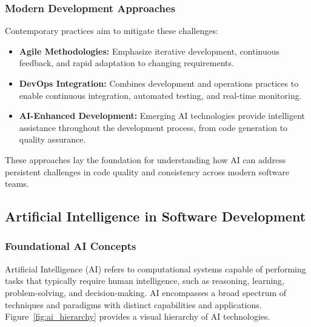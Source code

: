 \begin{spacing}{1.2}
\subsubsection*{Modern Development Approaches}
Contemporary practices aim to mitigate these challenges:

\begin{itemize}
    \item \textbf{Agile Methodologies:} Emphasize iterative development, continuous feedback, and rapid adaptation to changing requirements.
    
    \item \textbf{DevOps Integration:} Combines development and operations practices to enable continuous integration, automated testing, and real-time monitoring.
    
    \item \textbf{AI-Enhanced Development:} Emerging AI technologies provide intelligent assistance throughout the development process, from code generation to quality assurance.
\end{itemize}

These approaches lay the foundation for understanding how AI can address persistent challenges in code quality and consistency across modern software teams.

\subsection{Artificial Intelligence in Software Development}

\subsubsection*{Foundational AI Concepts}
Artificial Intelligence (AI) refers to computational systems capable of performing tasks that typically require human intelligence, such as reasoning, learning, problem-solving, and decision-making. AI encompasses a broad spectrum of techniques and paradigms with distinct capabilities and applications. Figure~\ref{fig:ai_hierarchy} provides a visual hierarchy of AI technologies.


\end{spacing}
